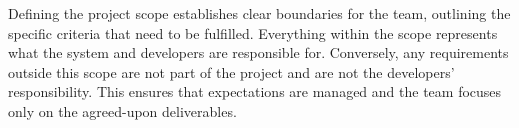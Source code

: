 \documentclass[a4paper]{article}
\begin{document}
Defining the project scope establishes clear boundaries for the team, outlining the specific criteria that need to be fulfilled.
Everything within the scope represents what the system and developers are responsible for. Conversely, any requirements outside 
this scope are not part of the project and are not the developers' responsibility. This ensures that expectations are managed and the 
team focuses only on the agreed-upon deliverables.
%
%
%
%
%    
\end{document}
